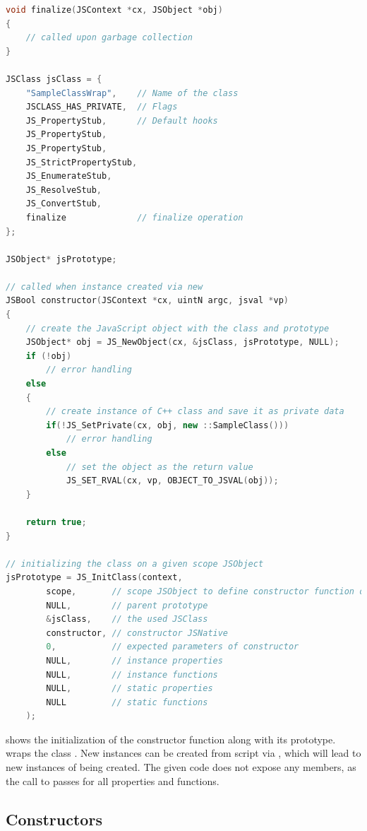 \SingleSpacing
\begin{lstlisting}[language=C++, caption=Initializing a class, label=lst:InitClass]
void finalize(JSContext *cx, JSObject *obj)
{
	// called upon garbage collection
}

JSClass jsClass = {
	"SampleClassWrap",    // Name of the class
	JSCLASS_HAS_PRIVATE,  // Flags
	JS_PropertyStub,      // Default hooks
	JS_PropertyStub, 
	JS_PropertyStub, 
	JS_StrictPropertyStub,
	JS_EnumerateStub, 
	JS_ResolveStub, 
	JS_ConvertStub, 
	finalize              // finalize operation
};

JSObject* jsPrototype;

// called when instance created via new
JSBool constructor(JSContext *cx, uintN argc, jsval *vp)
{
	// create the JavaScript object with the class and prototype
	JSObject* obj = JS_NewObject(cx, &jsClass, jsPrototype, NULL);
	if (!obj)
		// error handling
	else
	{
		// create instance of C++ class and save it as private data
		if(!JS_SetPrivate(cx, obj, new ::SampleClass()))
			// error handling
		else
			// set the object as the return value
			JS_SET_RVAL(cx, vp, OBJECT_TO_JSVAL(obj));
	}
	
	return true;
}

// initializing the class on a given scope JSObject
jsPrototype = JS_InitClass(context, 
		scope,       // scope JSObject to define constructor function on	
		NULL,        // parent prototype
		&jsClass,    // the used JSClass
		constructor, // constructor JSNative
		0,           // expected parameters of constructor
		NULL,        // instance properties
		NULL,        // instance functions
		NULL,        // static properties
		NULL         // static functions
	);
\end{lstlisting}
\OnehalfSpacing

\newpage
{} shows the initialization of the constructor function  along with its prototype.  wraps the  class . New instances can be created from script via , which will lead to new instances of  being created. The given code does not expose any members, as the call to  passes  for all properties and functions.

\subsection{Constructors}

